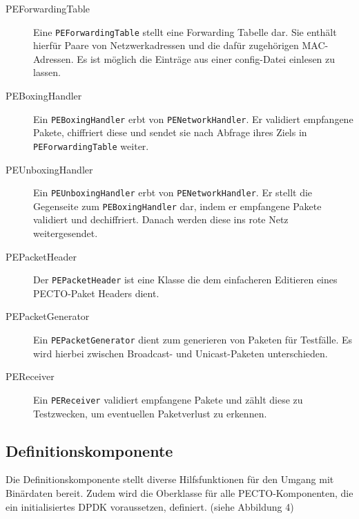 \documentclass[a4paper, 11pt, ngerman, fleqn]{article}
\begin{document}
\begin{description}
	\item[PEForwardingTable]
	Eine \texttt{PEForwardingTable} stellt eine Forwarding Tabelle dar. Sie enthält hierfür Paare von Netzwerkadressen und die dafür zugehörigen MAC-Adressen. Es ist möglich die Einträge aus einer config-Datei einlesen zu lassen.
	
	\item[PEBoxingHandler]
	Ein \texttt{PEBoxingHandler} erbt von \texttt{PENetworkHandler}. Er validiert empfangene Pakete, chiffriert diese und sendet sie nach Abfrage ihres Ziels in \texttt{PEForwardingTable} weiter.
	
	\item[PEUnboxingHandler] 
	Ein \texttt{PEUnboxingHandler} erbt von \texttt{PENetworkHandler}. Er stellt die Gegenseite zum \texttt{PEBoxingHandler} dar, indem er empfangene Pakete validiert und dechiffriert. Danach werden diese ins rote Netz weitergesendet.
	
	\item[PEPacketHeader]
	Der \texttt{PEPacketHeader} ist eine Klasse die dem einfacheren Editieren eines PECTO-Paket Headers dient.
	
	\item[PEPacketGenerator]
	Ein \texttt{PEPacketGenerator} dient zum generieren von Paketen für Testfälle. Es wird hierbei zwischen Broadcast- und Unicast-Paketen unterschieden.
	
	\item[PEReceiver]
	Ein \texttt{PEReceiver} validiert empfangene Pakete und zählt diese zu Testzwecken, um eventuellen Paketverlust zu erkennen.
\end{description}

\subsection{Definitionskomponente}
Die Definitionskomponente stellt diverse Hilfsfunktionen für den Umgang mit Binärdaten bereit.
Zudem wird die Oberklasse für alle PECTO-Komponenten, die ein initialisiertes DPDK voraussetzen, definiert. (siehe Abbildung 4)
\end{document}

